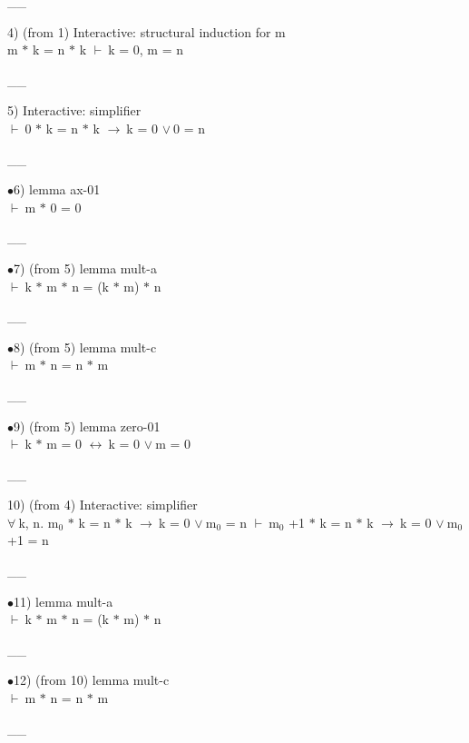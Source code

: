 \documentclass[a4paper]{article}
\newcommand{\Fol}{\mbox{$\vdash\ $}}
\newcommand{\Or}{\mbox{$\vee\ $}}
\newcommand{\Imp}{\mbox{$\rightarrow\ $}}
\newcommand{\Equiv}{\mbox{$\leftrightarrow\ $}}
\newcommand{\All}{\mbox{$\forall\ $}}
\begin{document}
\vspace{-1.5ex}\_\hrulefill \_

4)  (from 1) Interactive: structural induction  for m\\
m $*$ k = n $*$ k \Fol k = 0, m = n

\vspace{-1.5ex}\_\hrulefill \_

5) Interactive: simplifier \\
 \Fol 0 $*$ k = n $*$ k \Imp k = 0 \Or 0 = n

\vspace{-1.5ex}\_\hrulefill \_

$\bullet$6) lemma ax-01 \\
 \Fol m $*$ 0 = 0

\vspace{-1.5ex}\_\hrulefill \_

$\bullet$7)  (from 5) lemma mult-a \\
 \Fol k $*$ m $*$ n = (k $*$ m) $*$ n

\vspace{-1.5ex}\_\hrulefill \_

$\bullet$8)  (from 5) lemma mult-c \\
 \Fol m $*$ n = n $*$ m

\vspace{-1.5ex}\_\hrulefill \_

$\bullet$9)  (from 5) lemma zero-01 \\
 \Fol k $*$ m = 0 \Equiv k = 0 \Or m = 0

\vspace{-1.5ex}\_\hrulefill \_

10)  (from 4) Interactive: simplifier \\
\All k, n. $\mbox{m}_{0}$ $*$ k = n $*$ k \Imp k = 0 \Or $\mbox{m}_{0}$ = n \Fol $\mbox{m}_{0}$ +1 $*$ k = n $*$ k \Imp k = 0 \Or $\mbox{m}_{0}$ +1 = n

\vspace{-1.5ex}\_\hrulefill \_

$\bullet$11) lemma mult-a \\
 \Fol k $*$ m $*$ n = (k $*$ m) $*$ n

\vspace{-1.5ex}\_\hrulefill \_

$\bullet$12)  (from 10) lemma mult-c \\
 \Fol m $*$ n = n $*$ m

\vspace{-1.5ex}\_\hrulefill \_
\end{document}
